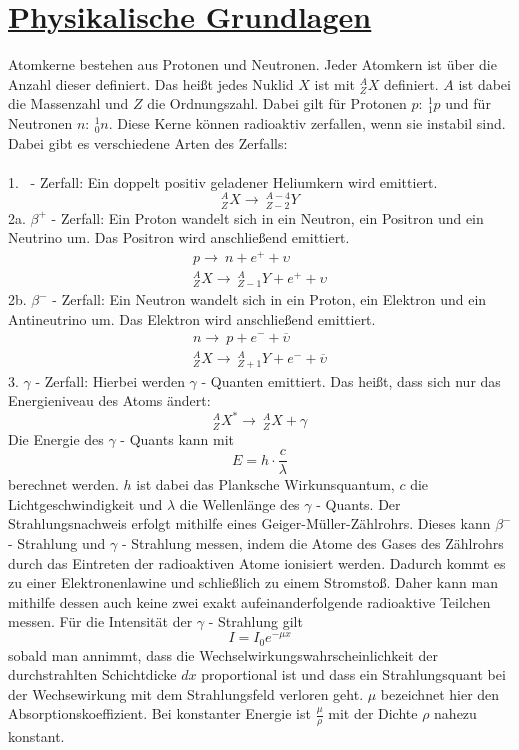 \documentclass[11pt,a4paper]{article}
\begin{document}
\section{\underline{Physikalische Grundlagen}}
Atomkerne bestehen aus Protonen und Neutronen. Jeder Atomkern ist über die Anzahl
dieser definiert. Das heißt jedes Nuklid $X$ ist mit $^A_Z{X}$ definiert. $A$ ist dabei
die Massenzahl und $Z$ die Ordnungszahl. Dabei gilt für Protonen $p:~^1_1p$ und für
Neutronen $n:~^1_0n$. Diese Kerne können radioaktiv zerfallen, wenn sie instabil
sind. Dabei gibt es verschiedene Arten des Zerfalls:
\\\\
1. \alpha~- Zerfall: Ein doppelt positiv geladener Heliumkern wird emittiert.
\begin{equation}
    ^A_Z{X} \rightarrow~^{A-4}_{Z-2}Y
\end{equation}
2a. $\beta ^+$ - Zerfall: Ein Proton wandelt sich in ein Neutron, ein Positron und ein
Neutrino um. Das Positron wird anschließend emittiert.
\begin{align}
  p \rightarrow~n + e^+ + \upsilon \\
    ^A_ZX \rightarrow~{^A_{Z-1}Y} + e^+ + \upsilon
\end{align}
2b. $\beta ^-$ - Zerfall: Ein Neutron wandelt sich in ein Proton, ein Elektron und ein
Antineutrino um. Das Elektron wird anschließend emittiert.
\begin{align}
  n \rightarrow~p + e^- + \overline{\upsilon} \\
    ^A_ZX \rightarrow~{^A_{Z+1}Y} + e^- + \overline{\upsilon}
\end{align}
3. $\gamma$ - Zerfall: Hierbei werden $\gamma$ - Quanten emittiert. Das heißt, dass sich nur das Energieniveau des Atoms ändert:
\begin{equation}
    ^A_ZX^* \rightarrow~{^A_ZX} + \gamma
\end{equation}
Die Energie des $\gamma$ - Quants kann mit
\begin{equation}
  E = h \cdot \frac{c}{\lambda}
\end{equation}
berechnet werden. $h$ ist dabei das Planksche Wirkunsquantum, $c$ die
Lichtgeschwindigkeit und $\lambda$ die Wellenlänge des $\gamma$ - Quants.
Der Strahlungsnachweis erfolgt mithilfe eines Geiger-Müller-Zählrohrs. Dieses kann
$\beta^-$ - Strahlung und $\gamma$ - Strahlung messen, indem die Atome des Gases des
Zählrohrs durch das Eintreten der radioaktiven Atome ionisiert werden. Dadurch kommt
es zu einer Elektronenlawine und schließlich zu einem Stromstoß. Daher kann man
mithilfe dessen auch keine zwei exakt aufeinanderfolgende radioaktive Teilchen messen.
Für die Intensität der $\gamma$ - Strahlung gilt
\begin{equation}
  I = I_0e^{- \mu x}
\end{equation}
sobald man annimmt, dass die Wechselwirkungswahrscheinlichkeit der durchstrahlten
Schichtdicke $dx$ proportional ist und dass ein Strahlungsquant bei der Wechsewirkung
mit dem Strahlungsfeld verloren geht. $\mu$ bezeichnet hier den
Absorptionskoeffizient. Bei konstanter Energie ist $\frac{\mu}{\rho}$ mit der Dichte
$\rho$ nahezu konstant.
\end{document}
